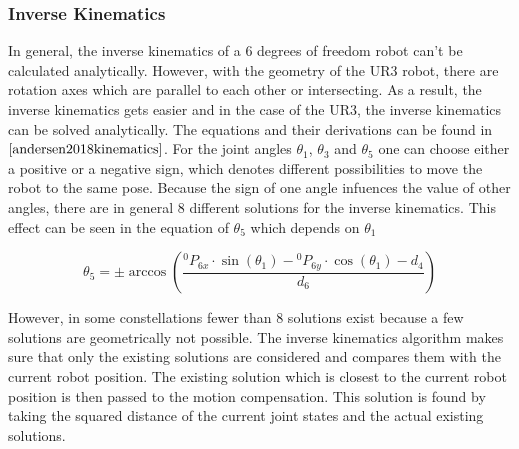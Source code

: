 \subsubsection{Inverse Kinematics}
In general, the inverse kinematics of a 6 degrees of freedom robot can’t be calculated analytically. However, with the geometry of the UR3 robot, there are rotation axes which are parallel to each other or intersecting. As a result, the inverse kinematics gets easier and in the case of the UR3, the inverse kinematics can be solved analytically. The equations and their derivations can be found in $\cite{andersen2018kinematics}$. For the joint angles $\theta_{1}$, $\theta_{3}$ and $\theta_{5}$ one can choose either a positive or a negative sign, which denotes different possibilities to move the robot to the same pose. Because the sign of one angle infuences the value of other angles, there are in general 8 different solutions for the inverse kinematics. This effect can be seen in the equation of $\theta_{5}$ which depends on $\theta_{1}$

\begin{equation}
\theta_{5}=\pm \arccos\left(\frac{{}^{0}{P}_{6x} \cdot \sin(\theta_{1})-{}^{0}{P}_{6y} \cdot \cos(\theta_{1})-d_{4}}{d_{6}}\right)
\label{eq3}
\end{equation}

However, in some constellations fewer than 8 solutions exist because a few solutions are geometrically not possible. The inverse kinematics algorithm makes sure that only the existing solutions are considered and compares them with the current robot position. The existing solution which is closest to the current robot position is then passed to the motion compensation. This solution is found by taking the squared distance of the current joint states and the actual existing solutions.
